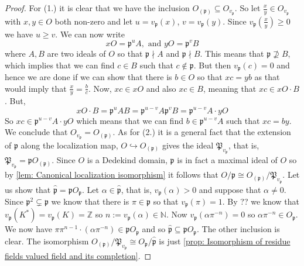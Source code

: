\documentclass{article}
\newcommand{\mfrak}[1]{\mathfrak{#1}}
\newcommand{\mbb}[1]{\mathbb{#1}}
\newcommand{\vp}{{v_{\mfrak p}}}
\numberwithin{equation}{section}
\begin{document}
\begin{proof}
    For (1.) it is clear that we have the inclusion $O_{(\mfrak p)} \subseteq O_\vp$. So let $\frac{x}{y} \in O_\vp$ with $x,y \in O$ both non-zero and let $u = \vp(x)$, $v = \vp(y)$. Since $\vp(\frac{x}{y})  \geq 0$ we have $u \geq v$. We can now write
    $$x O = \mfrak p^u A, \text{ and } y O = \mfrak p^v B$$
    where $A,B$ are two ideals of $O$ so that $\mfrak p \nmid A$ and $\mfrak p \nmid B$. This means that $\mfrak p \nsupseteq B$, which implies that we can find $c \in B$ such that $c \notin \mfrak p$. But then $\vp(c) = 0$ and hence we are done if we can show that there is $b \in O$ so that $xc = yb$ as that would imply that $\frac{x}{y} = \frac{b}{c}$. Now, $xc \in x O$ and also $xc \in B$, meaning that $xc \in x O \cdot B$. But,
    $$x O \cdot B = \mfrak p^u A B = \mfrak p^{u-v} A \mfrak p^v B = \mfrak p^{u-v} A \cdot y O$$
    So $xc \in \mfrak p^{u-v} A \cdot y O$ which means that we can find $b \in \mfrak p^{u-v} A$ such that $xc = by$. We conclude that $O_\vp = O_{(\mfrak p)}$.
    As for (2.) it is a general fact that the extension of $\mfrak p$ along the localization map,
    $O \hookrightarrow O_{(\mfrak p)}$
    gives the ideal $\mfrak P_{\vp}$, that is, $\mfrak P_{\vp} = \mfrak p O_{(\mfrak p)}$. Since $O$ is a Dedekind domain, $\mfrak p$ is in fact a maximal ideal of $O$ so by \cref{lem: Canonical localization isomorphism} it follows that $O / \mfrak p \cong O_{(\mfrak p)} / \mfrak P_\vp$. Let us show that $\hat {\mfrak p} = \mfrak p O_\mfrak p$. Let $\alpha \in \hat {\mfrak p}$, that is, $\vp(\alpha) > 0$ and suppose that $\alpha \neq 0$. Since $\mfrak p^2 \subsetneq \mfrak p$ we know that there is $\pi \in \mfrak p$ so that $\vp(\pi) = 1$. By ?? we know that $\vp(K^*) = \vp(K) = \mbb Z$ so $n := \vp(\alpha) \in \mbb N$. Now $\vp(\alpha \pi^{-n}) = 0$ so $\alpha \pi^{-n} \in O_\mfrak p$. We now have $\pi \pi^{n-1} \cdot (\alpha \pi^{-n}) \in \mfrak p O_\mfrak p$ and so $\hat {\mfrak p} \subseteq \mfrak p O_\mfrak p$. The other inclusion is clear. The isomorphism $O_{(\mfrak{p})} / \mfrak{P}_{v_{\mfrak{p}}} \cong O_{\mfrak{p}} / \hat{\mfrak{p}}$ is just \cref{prop: Isomorphism of residue fields valued field and its completion}.
\end{proof}
\end{document}

